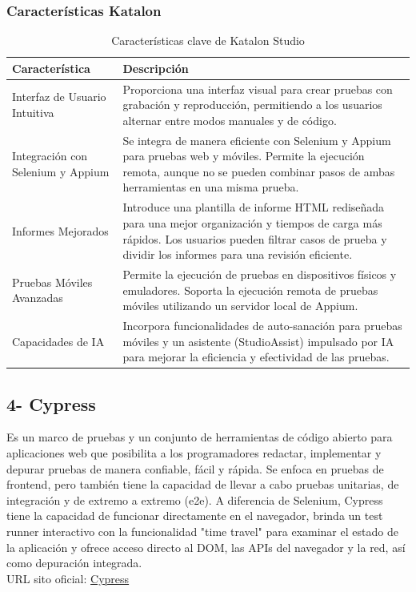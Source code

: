 \documentclass[man, floatsintext]{apa7}
\begin{document}
		\subsubsection {Características Katalon}
	\begin{table}[h!]
		\centering
		\begin{tabular}{|p{4cm}|p{10cm}|}
			\hline
			\textbf{Característica} & \textbf{Descripción} \\
			\hline
			Interfaz de Usuario Intuitiva & Proporciona una interfaz visual para crear pruebas con grabación y reproducción, permitiendo a los usuarios alternar entre modos manuales y de código. \\ \hline
			Integración con Selenium y Appium & Se integra de manera eficiente con Selenium y Appium para pruebas web y móviles. Permite la ejecución remota, aunque no se pueden combinar pasos de ambas herramientas en una misma prueba. \\ \hline
			Informes Mejorados & Introduce una plantilla de informe HTML rediseñada para una mejor organización y tiempos de carga más rápidos. Los usuarios pueden filtrar casos de prueba y dividir los informes para una revisión eficiente. \\ \hline
			Pruebas Móviles Avanzadas & Permite la ejecución de pruebas en dispositivos físicos y emuladores. Soporta la ejecución remota de pruebas móviles utilizando un servidor local de Appium. \\ \hline
			Capacidades de IA & Incorpora funcionalidades de auto-sanación para pruebas móviles y un asistente (StudioAssist) impulsado por IA para mejorar la eficiencia y efectividad de las pruebas. \\ \hline
		\end{tabular}
		\caption{Características clave de Katalon Studio}
		\label{tab:katalon_caracteristicas}
	\end{table}
	\FloatBarrier
	
	\subsection{4- Cypress}
	Es un marco de pruebas y un conjunto de herramientas de código abierto para aplicaciones web que posibilita a los programadores redactar, implementar y depurar pruebas de manera confiable, fácil y rápida. Se enfoca en pruebas de frontend, pero también tiene la capacidad de llevar a cabo pruebas unitarias, de integración y de extremo a extremo (e2e). A diferencia de Selenium, Cypress tiene la capacidad de funcionar directamente en el navegador, brinda un test runner interactivo con la funcionalidad "time travel" para examinar el estado de la aplicación y ofrece acceso directo al DOM, las APIs del navegador y la red, así como depuración integrada. \cite{keepcoding_cypress_testing}\\
		URL sito oficial: 
	\href{https://www.cypress.io/}{Cypress}
	
\end{document}
